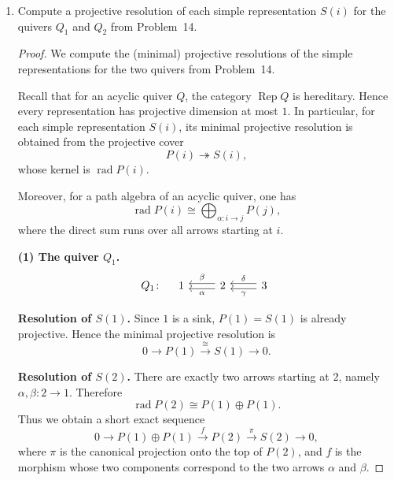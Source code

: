 \documentclass[11pt, a4paper]{article}
\begin{document}
\begin{enumerate}[leftmargin=*, label=\textbf{\arabic*.}]
\begin{proof}
    \medskip
    \noindent
    This determines all indecomposable projective and injective representations for $Q_1$ and $Q_2$.
    \end{proof}

\item Compute a projective resolution of each simple representation $S(i)$ for the quivers $Q_1$ and $Q_2$ from Problem~14.

\begin{proof}
    We compute the (minimal) projective resolutions of the simple representations for the two quivers from Problem~14.
    
    Recall that for an acyclic quiver $Q$, the category $\operatorname{Rep}Q$ is hereditary. Hence every representation has projective dimension at most $1$. In particular, for each simple representation $S(i)$, its minimal projective resolution is obtained from the projective cover
    \[
    P(i)\twoheadrightarrow S(i),
    \]
    whose kernel is $\operatorname{rad} P(i)$.
    
    Moreover, for a path algebra of an acyclic quiver, one has
    \[
    \operatorname{rad} P(i)\cong \bigoplus_{\alpha:i\to j} P(j),
    \]
    where the direct sum runs over all arrows starting at $i$.
    
    \bigskip
    \noindent\textbf{(1) The quiver $Q_1$.}
    \[
    Q_1\colon\quad
    \begin{tikzcd}
    1 & 2 \arrow[l, shift left, "\alpha"] \arrow[l, shift right, "\beta"']
    & 3 \arrow[l, shift left, "\gamma"] \arrow[l, shift right, "\delta"']
    \end{tikzcd}
    \]
    
    \medskip
    \noindent\textbf{Resolution of $S(1)$.}
    Since $1$ is a sink, $P(1)=S(1)$ is already projective. Hence the minimal projective resolution is
    \[
    0 \longrightarrow P(1) \xrightarrow{\;\cong\;} S(1) \longrightarrow 0.
    \]
    
    \medskip
    \noindent\textbf{Resolution of $S(2)$.}
    There are exactly two arrows starting at $2$, namely $\alpha,\beta:2\to 1$. Therefore
    \[
    \operatorname{rad} P(2)\cong P(1)\oplus P(1).
    \]
    Thus we obtain a short exact sequence
    \[
    0 \longrightarrow P(1)\oplus P(1)
    \xrightarrow{\;f\;}
    P(2)
    \xrightarrow{\;\pi\;}
    S(2)
    \longrightarrow 0,
    \]
    where $\pi$ is the canonical projection onto the top of $P(2)$, and $f$ is the morphism whose two components correspond to the two arrows $\alpha$ and $\beta$.
    

\end{proof}
\end{enumerate}
\end{document}
